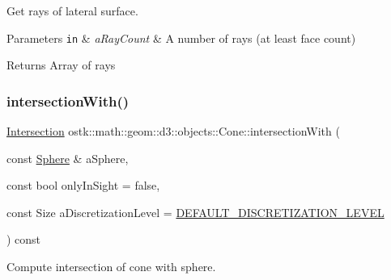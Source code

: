 Get rays of lateral surface. 


\begin{DoxyParams}[1]{Parameters}
\mbox{\tt in}  & {\em a\+Ray\+Count} & A number of rays (at least face count) \\
\hline
\end{DoxyParams}
\begin{DoxyReturn}{Returns}
Array of rays 
\end{DoxyReturn}
\mbox{\label{classostk_1_1math_1_1geom_1_1d3_1_1objects_1_1_cone_a28ee89d65bf8a7d03b28c48af68243ad}} 
\subsubsection{\texorpdfstring{intersection\+With()}{intersectionWith()}\hspace{0.1cm}{\footnotesize\ttfamily [1/2]}}
{\footnotesize\ttfamily \hyperlink{classostk_1_1math_1_1geom_1_1d3_1_1_intersection}{Intersection} ostk\+::math\+::geom\+::d3\+::objects\+::\+Cone\+::intersection\+With (\begin{DoxyParamCaption}\item[{const \hyperlink{classostk_1_1math_1_1geom_1_1d3_1_1objects_1_1_sphere}{Sphere} \&}]{a\+Sphere,  }\item[{const bool}]{only\+In\+Sight = {\ttfamily false},  }\item[{const Size}]{a\+Discretization\+Level = {\ttfamily \hyperlink{_pyramid_8hpp_a3eb9931e85ba4c9718113211e549e91d}{D\+E\+F\+A\+U\+L\+T\+\_\+\+D\+I\+S\+C\+R\+E\+T\+I\+Z\+A\+T\+I\+O\+N\+\_\+\+L\+E\+V\+EL}} }\end{DoxyParamCaption}) const}



Compute intersection of cone with sphere. 


